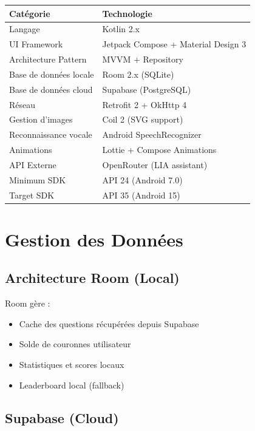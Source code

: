\documentclass[12pt,a4paper,openany]{report}
\begin{document}
    \begin{tabular}{l|l}
    \toprule
    \textbf{Catégorie} & \textbf{Technologie} \\
    \midrule
    Langage & Kotlin 2.x \\
    UI Framework & Jetpack Compose + Material Design 3 \\
    Architecture Pattern & MVVM + Repository \\
    Base de données locale & Room 2.x (SQLite) \\
    Base de données cloud & Supabase (PostgreSQL) \\
    Réseau & Retrofit 2 + OkHttp 4 \\
    Gestion d'images & Coil 2 (SVG support) \\
    Reconnaissance vocale & Android SpeechRecognizer \\
    Animations & Lottie + Compose Animations \\
    API Externe & OpenRouter (LIA assistant) \\
    \midrule
    Minimum SDK & API 24 (Android 7.0) \\
    Target SDK & API 35 (Android 15) \\
    \bottomrule
    \end{tabular}

    \chapter{Gestion des Données}

    \section{Architecture Room (Local)}

    Room gère :
    \begin{itemize}
      \item Cache des questions récupérées depuis Supabase
      \item Solde de couronnes utilisateur
      \item Statistiques et scores locaux
      \item Leaderboard local (fallback)
    \end{itemize}

    \section{Supabase (Cloud)}
\end{document}
